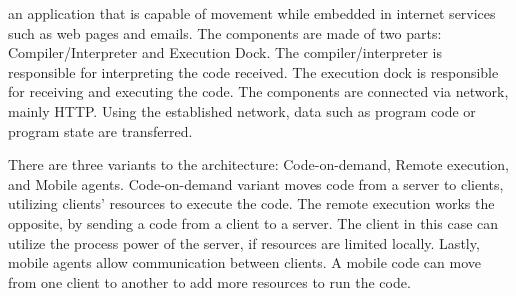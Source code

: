 \begin{summary}
an application that is capable of movement while embedded in internet services
such as web pages and emails. The components are made of two parts:
Compiler/Interpreter and Execution Dock. The compiler/interpreter is
responsible for interpreting the code received. The execution dock is
responsible for receiving and executing the code. The components are connected
via network, mainly HTTP. Using the established network, data such as program
code or program state are transferred.

There are three variants to the architecture: Code-on-demand, Remote execution,
and Mobile agents. Code-on-demand variant moves code from a server to clients,
utilizing clients’ resources to execute the code. The remote execution works
the opposite, by sending a code from a client to a server. The client in this
case can utilize the process power of the server, if resources are limited
locally. Lastly, mobile agents allow communication between clients. A mobile
code can move from one client to another to add more resources to run the code.
\end{summary}

